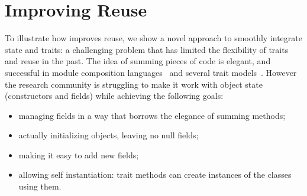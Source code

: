 \saveSpace\saveSpace\section{Improving Reuse}\saveSpace




To illustrate how \name improves reuse,
we show a novel approach
to smoothly integrate state and traits: a challenging problem that has limited the flexibility of traits and
reuse in the past.
The idea of summing pieces of
code is elegant, and successful in module
composition languages~\cite{ancona2002calculus} and several trait
models~\cite{ducasse2006traits,Bergel2007,BETTINI2013521,fjig}.  However the research
community is struggling to make it work with object state (constructors
and fields) while achieving the following goals:

\begin{itemize}
\item managing fields in a way that borrows the elegance of summing methods;
\item actually initializing objects, leaving no null fields;
\item making it easy to add new fields;
\item allowing self instantiation: trait methods can create instances of the classes using them.
\end{itemize}

